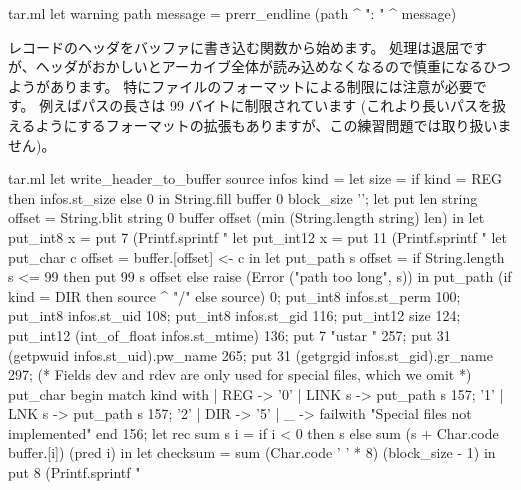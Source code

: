 \begin{answer}
\begin{listingcodefile}{tar.ml}
let warning path message =  prerr_endline (path ^ ": " ^ message)
\end{listingcodefile}
%
レコードのヘッダをバッファに書き込む関数から始めます。
処理は退屈ですが、ヘッダがおかしいとアーカイブ全体が読み込めなくなるので慎重になるひつようがあります。
特にファイルのフォーマットによる制限には注意が必要です。
例えばパスの長さは 99 バイトに制限されています
(これより長いパスを扱えるようにするフォーマットの拡張もありますが、この練習問題では取り扱いません)。
%
\begin{listingcodefile}{tar.ml}
let write_header_to_buffer source infos kind =
  let size = if kind = REG then infos.st_size else 0 in
  String.fill buffer 0 block_size '';
  let put len string offset =
    String.blit string 0 buffer offset (min (String.length string) len) in
  let put_int8 x = put 7 (Printf.sprintf "%
  let put_int12 x = put 11 (Printf.sprintf "%
  let put_char c offset = buffer.[offset] <- c in
  let put_path s offset =
    if String.length s <= 99 then put 99 s offset
    else raise (Error ("path too long", s)) in
  put_path (if kind = DIR then source ^ "/" else source) 0;
  put_int8 infos.st_perm 100;
  put_int8 infos.st_uid 108;
  put_int8 infos.st_gid 116;
  put_int12 size 124;
  put_int12 (int_of_float infos.st_mtime) 136;
  put 7 "ustar  " 257;
  put 31 (getpwuid infos.st_uid).pw_name 265;
  put 31 (getgrgid infos.st_gid).gr_name 297;
  (* Fields dev and rdev are only used for special files, which we omit *)
  put_char
    begin match kind with
    | REG -> '0'
    | LINK s -> put_path s 157; '1'
    | LNK s ->  put_path s 157; '2'
    | DIR -> '5'
    | _ -> failwith "Special files not implemented"
    end 156;
  let rec sum s i =
    if i < 0 then s else sum (s + Char.code buffer.[i]) (pred i) in
  let checksum = sum (Char.code ' ' * 8) (block_size - 1)  in
  put 8 (Printf.sprintf "%
\end{listingcodefile}
%

\end{answer}
